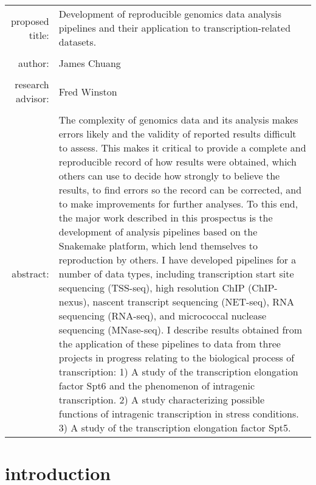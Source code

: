 \documentclass[9pt, letterpaper]{article}
\begin{document}
\begin{titlepage}
    \begin{tabular}{ r p{13cm} }
        proposed title:     & Development of reproducible genomics data analysis pipelines and their application to transcription-related datasets. \\
 		                    & \\
        author:	            & James Chuang \\
 		                    & \\
        research advisor:   & Fred Winston \\
 		                    & \\
        abstract:	        & The complexity of genomics data and its analysis makes errors likely and the validity of reported results difficult to assess. This makes it critical to provide a complete and reproducible record of how results were obtained, which others can use to decide how strongly to believe the results, to find errors so the record can be corrected, and to make improvements for further analyses. To this end, the major work described in this prospectus is the development of analysis pipelines based on the Snakemake platform, which lend themselves to reproduction by others. I have developed pipelines for a number of data types, including transcription start site sequencing (TSS-seq), high resolution ChIP (ChIP-nexus), nascent transcript sequencing (NET-seq), RNA sequencing (RNA-seq), and micrococcal nuclease sequencing (MNase-seq). I describe results obtained from the application of these pipelines to data from three projects in progress relating to the biological process of transcription: 1) A study of the transcription elongation factor Spt6 and the phenomenon of intragenic transcription. 2) A study characterizing possible functions of intragenic transcription in stress conditions. 3) A study of the transcription elongation factor Spt5.
    \end{tabular}
\end{titlepage}

\tableofcontents
\newpage

\section{introduction}
\end{document}
